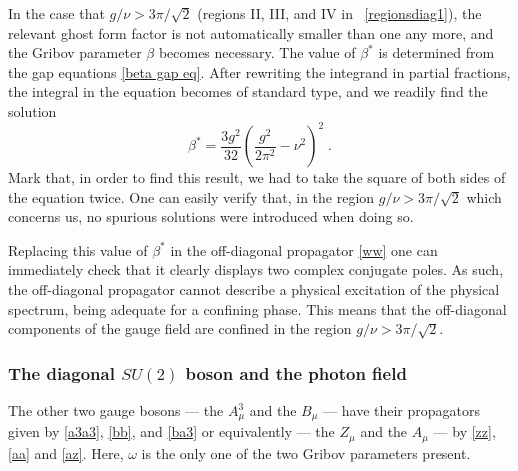 In the case that $g/\nu>3\pi/\sqrt2$ (regions II, III, and IV in \figurename\ \ref{regionsdiag1}), the relevant ghost form factor is not automatically smaller than one any more, and the Gribov parameter $\beta$ becomes necessary. The value of $\beta^{\ast}$ is determined from the gap equations \eqref{beta gap eq}. After rewriting the integrand in partial fractions, the integral in the equation becomes of standard type, and we readily find the solution
\begin{equation}
  \beta^{\ast} = \frac{3g^2}{32} \left(\frac{g^2}{2\pi^2}-\nu^2\right)^2 \;.
\end{equation}
Mark that, in order to find this result, we had to take the square of both sides of the equation twice. One can easily verify that, in the region $g/\nu>3\pi/\sqrt2$ which concerns us, no spurious solutions were introduced when doing so.

Replacing this value of $\beta^{\ast}$ in the off-diagonal propagator \eqref{ww} one can immediately check that it
clearly displays two complex conjugate poles. As such, the off-diagonal propagator  cannot describe a physical excitation of the physical spectrum, being adequate for a confining phase. This means that the off-diagonal components of the gauge field are confined in the region $g/\nu>3\pi/\sqrt2$.
















\subsubsection{The diagonal $SU(2)$ boson and the photon field} \label{sect7}
The other two gauge bosons --- the $A^3_\mu$ and the $B_\mu$ --- have their propagators given by \eqref{a3a3}, \eqref{bb}, and \eqref{ba3} or equivalently --- the $Z_\mu$ and the $A_\mu$ --- by \eqref{zz}, \eqref{aa} and \eqref{az}. Here, $\omega$ is the only one of the two Gribov parameters present.

